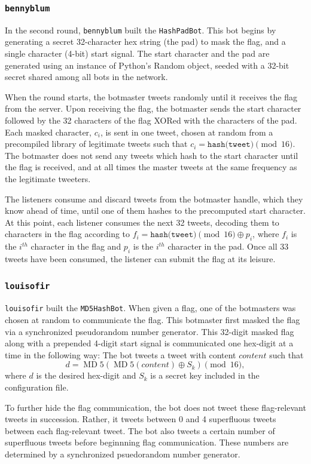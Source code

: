\documentclass[11pt, oneside]{article} %
\numberwithin{equation}{section} %
\numberwithin{figure}{section} %
\numberwithin{table}{section} %
\renewcommand{\c}[1]{\texttt{#1}}
\newcommand{\teambb}{\c{bennyblum}}
\newcommand{\teamol}{\c{louisofir}}
\DeclareMathOperator{\MD}{MD}
\begin{document}
		\subsubsection{\teambb{}}
        	In the second round, \teambb{} built the \c{HashPadBot}. This bot begins by generating a secret 32-character hex string (the pad) to mask the flag, and a single character (4-bit) start signal. The start character and the pad are generated using an instance of Python's Random object, seeded with a 32-bit secret shared among all bots in the network.
        	
            When the round starts, the botmaster tweets randomly until it receives the flag from the server. Upon receiving the flag, the botmaster sends the start character followed by the 32 characters of the flag XORed with the characters of the pad. Each masked character, $c_i$, is sent in one tweet, chosen at random from a precompiled library of legitimate tweets such that $c_i = \texttt{hash(tweet)} \pmod{16}$. The botmaster does not send any tweets which hash to the start character until the flag is received, and at all times the master tweets at the same frequency as the legitimate tweeters.
        	
            The listeners consume and discard tweets from the botmaster handle, which they know ahead of time, until one of them hashes to the precomputed start character. At this point, each listener consumes the next 32 tweets, decoding them to characters in the flag according to $f_i = \texttt{hash(tweet)} \pmod{16} \oplus p_i$, where $f_i$ is the $i^{th}$ character in the flag and $p_i$ is the $i^{th}$ character in the pad. Once all 33 tweets have been consumed, the listener can submit the flag at its leisure.
		\subsubsection{\teamol{}}
			\teamol{} built the \c{MD5HashBot}. When given a flag, one of the botmasters was chosen at random to communicate the flag. This botmaster first masked the flag via a synchronized pseudorandom number generator. This 32-digit masked flag along with a prepended 4-digit start signal is communicated one hex-digit at a time in the following way: The bot tweets a tweet with content $content$ such that
			\[
				d=\MD5(\MD5(content)\oplus S_k) \pmod{16},
			\] 
			where $d$ is the desired hex-digit and $S_k$ is a secret key included in the configuration file.

			To further hide the flag communication, the bot does not tweet these flag-relevant tweets in succession. Rather, it tweets between 0 and 4 superfluous tweets between each  flag-relevant tweet. The bot also tweets a certain number of superfluous tweets before beginnning flag communication. These numbers are determined by a synchronized psuedorandom number generator.
\end{document}
